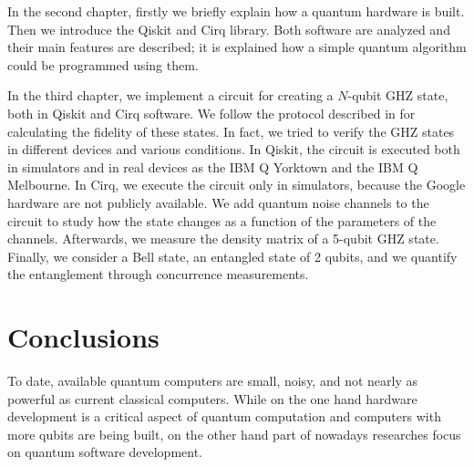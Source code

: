 \documentclass[11pt, a4paper, twoside, openright]{book}
\renewcommand{\'}[0]{\`}
\theoremstyle{definition}
\begin{document}
In the second chapter, firstly we briefly explain how a quantum hardware is built. Then we introduce the Qiskit and Cirq library. Both software are analyzed and their main features are described; it is explained how a simple quantum algorithm could be programmed using them.

In the third chapter, we implement a circuit for creating a $N$-qubit GHZ state, both in Qiskit and Cirq software. We follow the protocol described in \cite{Article} for calculating the fidelity of these states. In fact, we tried to verify the GHZ states in different devices and various conditions. In Qiskit, the circuit is executed both in simulators and in real devices as the IBM Q Yorktown and the IBM Q Melbourne.
In Cirq, we execute the circuit only in simulators, because the Google hardware are not publicly available. We add quantum noise channels to the circuit to study how the state changes as a function of the parameters of the channels. Afterwards, we measure the density matrix of a 5-qubit GHZ state. Finally, we consider a Bell state, an entangled state of 2 qubits, and we quantify the entanglement through concurrence measurements.







\mainmatter
\pagestyle{fancy}%


%



\backmatter
\pagestyle{plain}%

\chapter{Conclusions}

To date, available quantum computers are small, noisy, and not nearly as powerful as current classical computers. While on the one hand hardware development is a critical aspect of quantum computation and computers with more qubits are being built, on the other hand part of nowadays researches focus on quantum software development.
\end{document}
